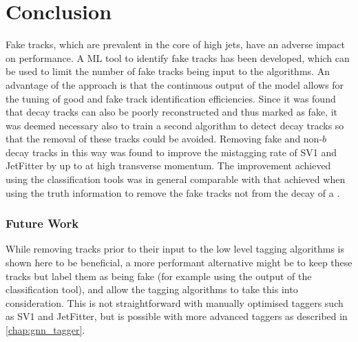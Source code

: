 


\section{Conclusion}\label{sec:fake_track_mva_conclusion}

Fake tracks, which are prevalent in the core of high \pt jets, have an adverse impact on \btagging performance.
A ML tool to identify fake tracks has been developed, which can be used to limit the number of fake tracks being input to the \btagging algorithms.
An advantage of the approach is that the continuous output of the model allows for the tuning of good and fake track identification efficiencies.
Since it was found that \bhadron decay tracks can also be poorly reconstructed and thus marked as fake, it was deemed necessary also to train a second algorithm to detect \bhadron decay tracks so that the removal of these tracks could be avoided.
Removing fake and non-$b$ decay tracks in this way was found to improve the \ljet mistagging rate of SV1 and JetFitter by up to  at high transverse momentum.
The improvement achieved using the classification tools was in general comparable with that achieved when using the truth information to remove the fake tracks not from the decay of a \bhadron.

\subsubsection{Future Work}
While removing tracks prior to their input to the low level tagging algorithms is shown here to be beneficial, a more performant alternative might be to keep these tracks but label them as being fake (for example using the output of the classification tool), and allow the tagging algorithms to take this into consideration.
This is not straightforward with manually optimised taggers such as SV1 and JetFitter, but is possible with more advanced taggers as described in \cref{chap:gnn_tagger}.

